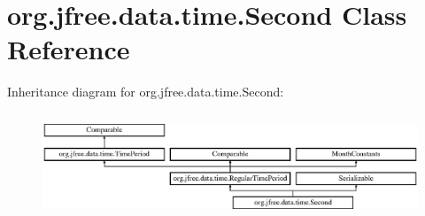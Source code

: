 \hypertarget{classorg_1_1jfree_1_1data_1_1time_1_1_second}{}\section{org.\+jfree.\+data.\+time.\+Second Class Reference}
\label{classorg_1_1jfree_1_1data_1_1time_1_1_second}
Inheritance diagram for org.\+jfree.\+data.\+time.\+Second\+:\begin{figure}[H]
\begin{center}
\leavevmode
\includegraphics[height=3.190883cm]{classorg_1_1jfree_1_1data_1_1time_1_1_second}
\end{center}
\end{figure}

